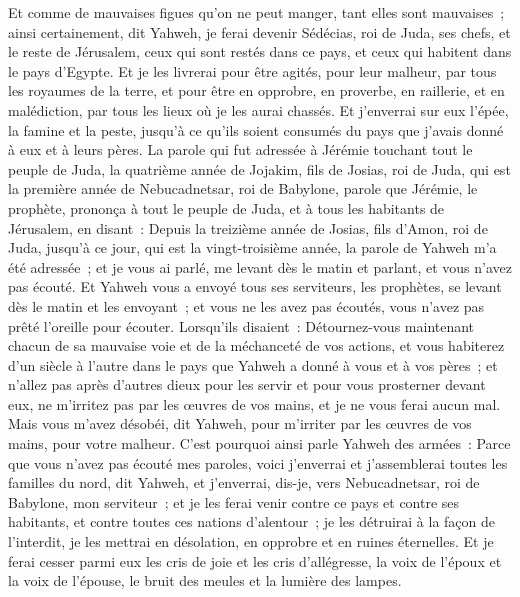 \begin{multicols}{2}
Et comme de mauvaises figues qu'on ne peut manger, tant elles sont mauvaises~; ainsi certainement, dit Yahweh, je ferai devenir Sédécias, roi de Juda, ses chefs, et le reste de Jérusalem, ceux qui sont restés dans ce pays, et ceux qui habitent dans le pays d'Egypte.
Et je les livrerai pour être agités, pour leur malheur, par tous les royaumes de la terre, et pour être en opprobre, en proverbe, en raillerie, et en malédiction, par tous les lieux où je les aurai chassés.
Et j'enverrai sur eux l'épée, la famine et la peste, jusqu'à ce qu'ils soient consumés du pays que j'avais donné à eux et à leurs pères.
\VerseOne{}La parole qui fut adressée à Jérémie touchant tout le peuple de Juda, la quatrième année de Jojakim, fils de Josias, roi de Juda, qui est la première année de Nebucadnetsar, roi de Babylone,
parole que Jérémie, le prophète, prononça à tout le peuple de Juda, et à tous les habitants de Jérusalem, en disant~:
Depuis la treizième année de Josias, fils d'Amon, roi de Juda, jusqu'à ce jour, qui est la vingt-troisième année, la parole de Yahweh m'a été adressée~; et je vous ai parlé, me levant dès le matin et parlant, et vous n'avez pas écouté.
Et Yahweh vous a envoyé tous ses serviteurs, les prophètes, se levant dès le matin et les envoyant~; et vous ne les avez pas écoutés, vous n'avez pas prêté l'oreille pour écouter.
Lorsqu'ils disaient~: Détournez-vous maintenant chacun de sa mauvaise voie et de la méchanceté de vos actions, et vous habiterez d'un siècle à l'autre dans le pays que Yahweh a donné à vous et à vos pères~;
et n'allez pas après d'autres dieux pour les servir et pour vous prosterner devant eux, ne m'irritez pas par les œuvres de vos mains, et je ne vous ferai aucun mal.
Mais vous m'avez désobéi, dit Yahweh, pour m'irriter par les œuvres de vos mains, pour votre malheur.
C'est pourquoi ainsi parle Yahweh des armées~: Parce que vous n'avez pas écouté mes paroles,
voici j'enverrai et j'assemblerai toutes les familles du nord, dit Yahweh, et j'enverrai, dis-je, vers Nebucadnetsar, roi de Babylone, mon serviteur~; et je les ferai venir contre ce pays et contre ses habitants, et contre toutes ces nations d'alentour~; je les détruirai à la façon de l'interdit, je les mettrai en désolation, en opprobre et en ruines éternelles.
Et je ferai cesser parmi eux les cris de joie et les cris d'allégresse, la voix de l'époux et la voix de l'épouse, le bruit des meules et la lumière des lampes.

\end{multicols}
